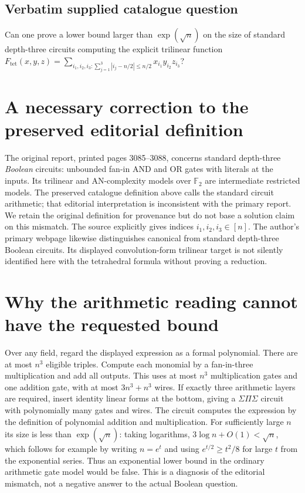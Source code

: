 \documentclass[11pt]{article}
\begin{document}
\subsection{Verbatim supplied catalogue question}
Can one prove a lower bound larger than $\exp(\sqrt n)$ on the size of standard depth-three circuits computing the explicit trilinear function $F_{\mathrm{tet}}(x,y,z)=\sum_{i_1,i_2,i_3:\sum_{j=1}^3|i_j-n/2|\leq n/2}x_{i_1}y_{i_2}z_{i_3}$?

\section{A necessary correction to the preserved editorial definition}
The original report, printed pages 3085--3088, concerns standard
depth-three \emph{Boolean} circuits: unbounded fan-in AND and OR gates
with literals at the inputs. Its trilinear and AN-complexity models over
$\mathbb F_2$ are intermediate restricted models. The preserved
catalogue definition above calls the standard circuit arithmetic; that
editorial interpretation is inconsistent with the primary report.
We retain the original definition for provenance but do not base a
solution claim on this mismatch. The source explicitly gives indices
$i_1,i_2,i_3\in[n]$.
The author's primary webpage likewise distinguishes canonical from
standard depth-three Boolean circuits. Its displayed convolution-form
trilinear target is not silently identified here with the tetrahedral
formula without proving a reduction.

\section{Why the arithmetic reading cannot have the requested bound}
Over any field, regard the displayed expression as a formal polynomial.
There are at most $n^3$ eligible triples. Compute each monomial by a
fan-in-three multiplication and add all outputs. This uses at most
$n^3$ multiplication gates and one addition gate, with at most
$3n^3+n^3$ wires. If exactly three arithmetic layers are required,
insert identity linear forms at the bottom, giving a
$\Sigma\Pi\Sigma$ circuit with polynomially many gates and wires.
The circuit computes the expression by the definition of polynomial
addition and multiplication. For sufficiently large $n$ its size is
less than $\exp(\sqrt n)$: taking logarithms, $3\log n+O(1)<\sqrt n$,
which follows for example by writing $n=e^t$ and using
$e^{t/2}\ge t^2/8$ for large $t$ from the exponential series.
Thus an exponential lower bound in the ordinary arithmetic gate model
would be false. This is a diagnosis of the editorial mismatch, not a
negative answer to the actual Boolean question.
\end{document}
